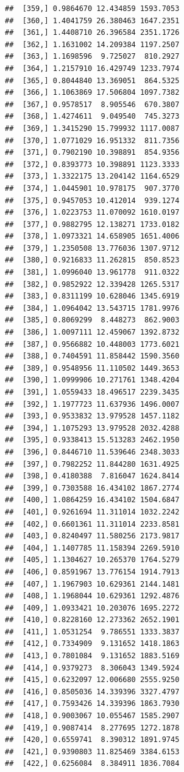 \documentclass[article]{jss}\usepackage[]{graphicx}\usepackage[]{xcolor}
\makeatletter
\newenvironment{kframe}{%
 \def\at@end@of@kframe{}%
 \ifinner\ifhmode%
  \def\at@end@of@kframe{\end{minipage}}%
  \begin{minipage}{\columnwidth}%
 \fi\fi%
 \def\FrameCommand##1{\hskip\@totalleftmargin \hskip-\fboxsep
 \colorbox{shadecolor}{##1}\hskip-\fboxsep
     \hskip-\linewidth \hskip-\@totalleftmargin \hskip\columnwidth}%
 \MakeFramed {\advance\hsize-\width
   \@totalleftmargin\z@ \linewidth\hsize
   \@setminipage}}%
 {\par\unskip\endMakeFramed%
 \at@end@of@kframe}
\newenvironment{knitrout}{}{} %
\makeatother
\begin{document}
\begin{knitrout}
\begin{kframe}
\begin{verbatim}
##  [359,] 0.9864670 12.434859 1593.7053
##  [360,] 1.4041759 26.380463 1647.2351
##  [361,] 1.4408710 26.396584 2351.1726
##  [362,] 1.1631002 14.209384 1197.2507
##  [363,] 1.1698596  9.725027  810.2927
##  [364,] 1.2157910 16.429749 1233.7974
##  [365,] 0.8044840 13.369051  864.5325
##  [366,] 1.1063869 17.506804 1097.7382
##  [367,] 0.9578517  8.905546  670.3807
##  [368,] 1.4274611  9.049540  745.3273
##  [369,] 1.3415290 15.799932 1117.0087
##  [370,] 1.0771029 16.951332  811.7356
##  [371,] 0.7902190 10.398891  854.9356
##  [372,] 0.8393773 10.398891 1123.3333
##  [373,] 1.3322175 13.204142 1164.6529
##  [374,] 1.0445901 10.978175  907.3770
##  [375,] 0.9457053 10.412014  939.1274
##  [376,] 1.0223753 11.070092 1610.0197
##  [377,] 0.9882795 12.138271 1733.0182
##  [378,] 1.0973321 14.658905 1651.4006
##  [379,] 1.2350508 13.776036 1307.9712
##  [380,] 0.9216833 11.262815  850.8523
##  [381,] 1.0996040 13.961778  911.0322
##  [382,] 0.9852922 12.339428 1265.5317
##  [383,] 0.8311199 10.628046 1345.6919
##  [384,] 1.0964042 13.543715 1781.9976
##  [385,] 0.8069299  8.448273  862.9003
##  [386,] 1.0097111 12.459067 1392.8732
##  [387,] 0.9566882 10.448003 1773.6021
##  [388,] 0.7404591 11.858442 1590.3560
##  [389,] 0.9548956 11.110502 1449.3653
##  [390,] 1.0999906 10.271761 1348.4204
##  [391,] 1.0559433 18.496517 2239.3435
##  [392,] 1.1977723 11.637936 1496.0007
##  [393,] 0.9533832 13.979528 1457.1182
##  [394,] 1.1075293 13.979528 2032.4288
##  [395,] 0.9338413 15.513283 2462.1950
##  [396,] 0.8446710 11.539646 2348.3033
##  [397,] 0.7982252 11.844280 1631.4925
##  [398,] 0.4180388  7.816047 1624.8414
##  [399,] 0.7303588 16.434102 1867.2774
##  [400,] 1.0864259 16.434102 1504.6847
##  [401,] 0.9261694 11.311014 1032.2242
##  [402,] 0.6601361 11.311014 2233.8581
##  [403,] 0.8240497 11.580256 2173.9817
##  [404,] 1.1407785 11.158394 2269.5910
##  [405,] 1.1304627 10.265370 1764.5279
##  [406,] 0.8591967 13.776154 1914.7913
##  [407,] 1.1967903 10.629361 2144.1481
##  [408,] 1.1968044 10.629361 1292.4876
##  [409,] 1.0933421 10.203076 1695.2272
##  [410,] 0.8228160 12.273362 2652.1901
##  [411,] 1.0531254  9.786551 1333.3837
##  [412,] 0.7334909  9.131652 1418.1863
##  [413,] 0.7801084  9.131652 1883.5169
##  [414,] 0.9379273  8.306043 1349.5924
##  [415,] 0.6232097 12.006680 2555.9250
##  [416,] 0.8505036 14.339396 3327.4797
##  [417,] 0.7593426 14.339396 1863.7930
##  [418,] 0.9003067 10.055467 1585.2907
##  [419,] 0.9087414  8.277695 1272.1878
##  [420,] 0.6559741  8.390312 1891.9745
##  [421,] 0.9390803 11.825469 3384.6153
##  [422,] 0.6256084  8.384911 1836.7084

\end{verbatim}
\end{kframe}
\end{knitrout}
\end{document}
